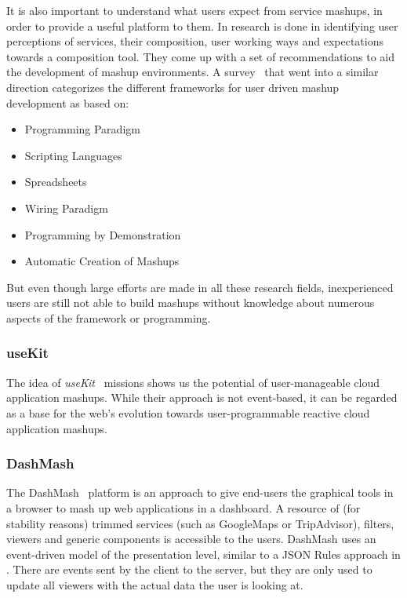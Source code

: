 \documentclass[11pt]{article}%
\begin{document}
It is also important to understand what users expect from service mashups, in order to provide a useful platform to them. In \cite{2010-Namoun_etal-EURCW.pdf} research is done in identifying user perceptions of services, their composition, user working ways and expectations towards a composition tool. They come up with a set of recommendations to aid the development of mashup environments. A survey~\cite{2009-Fischer_etal-OCAMG.pdf} that went into a similar direction categorizes the different frameworks for user driven mashup development as based on:
 \begin{itemize}
  \item Programming Paradigm
  \item Scripting Languages
  \item Spreadsheets
  \item Wiring Paradigm
  \item Programming by Demonstration
  \item Automatic Creation of Mashups
\end{itemize}
But even though large efforts are made in all these research fields, inexperienced users are still not able to build mashups without knowledge about numerous aspects of the framework or programming.

\subsubsection{useKit}
The idea of \emph{useKit}~\cite{2010-Rizzotti_Burkhart-useKit.pdf} missions shows us the potential of user-manageable cloud application mashups. While their approach is not event-based, it can be regarded as a base for the web's evolution towards user-programmable reactive cloud application mashups.

\subsubsection{DashMash}
The DashMash~\cite{2011-Cappiello_etal-DashMash.pdf} platform is an approach to give end-users the graphical tools in a browser to mash up web applications in a dashboard. A resource of (for stability reasons) trimmed services (such as GoogleMaps or TripAdvisor), filters, viewers and generic components is accessible to the users. DashMash uses an event-driven model of the presentation level, similar to a JSON Rules approach in \cite{2009-Pascalau_Giurca-RBACEM.pdf}. There are events sent by the client to the server, but they are only used to update all viewers with the actual data the user is looking at.
\end{document}

